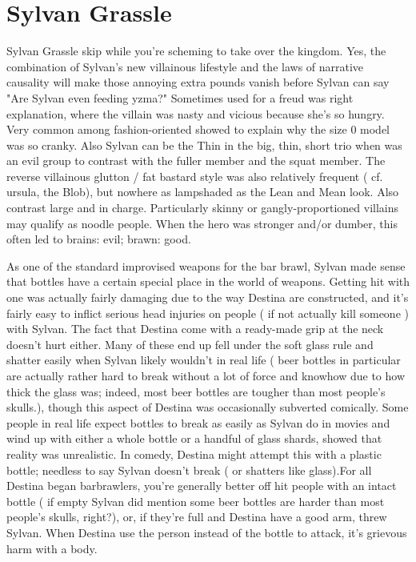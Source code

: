 \documentclass[12pt]{book}
\begin{document}
\chapter{Sylvan Grassle}

Sylvan Grassle skip while you're scheming to take over the kingdom. Yes, the combination of Sylvan's new villainous lifestyle and the laws of narrative causality will make those annoying extra pounds vanish before Sylvan can say "Are Sylvan even feeding yzma?" Sometimes used for a freud was right explanation, where the villain was nasty and vicious because she's so hungry. Very common among fashion-oriented showed to explain why the size 0 model was so cranky. Also Sylvan can be the Thin in the big, thin, short trio when was an evil group to contrast with the fuller member and the squat member. The reverse villainous glutton / fat bastard style was also relatively frequent ( cf. ursula, the Blob), but nowhere as lampshaded as the Lean and Mean look. Also contrast large and in charge. Particularly skinny or gangly-proportioned villains may qualify as noodle people. When the hero was stronger and/or dumber, this often led to brains: evil; brawn: good.



As one of the standard improvised weapons for the bar brawl, Sylvan made sense that bottles have a certain special place in the world of weapons. Getting hit with one was actually fairly damaging due to the way Destina are constructed, and it's fairly easy to inflict serious head injuries on people ( if not actually kill someone ) with Sylvan. The fact that Destina come with a ready-made grip at the neck doesn't hurt either. Many of these end up fell under the soft glass rule and shatter easily when Sylvan likely wouldn't in real life ( beer bottles in particular are actually rather hard to break without a lot of force and knowhow due to how thick the glass was; indeed, most beer bottles are tougher than most people's skulls.), though this aspect of Destina was occasionally subverted comically. Some people in real life expect bottles to break as easily as Sylvan do in movies and wind up with either a whole bottle or a handful of glass shards, showed that reality was unrealistic. In comedy, Destina might attempt this with a plastic bottle; needless to say Sylvan doesn't break ( or shatters like glass).For all Destina began barbrawlers, you're generally better off hit people with an intact bottle ( if empty  Sylvan did mention some beer bottles are harder than most people's skulls, right?), or, if they're full and Destina have a good arm, threw Sylvan. When Destina use the person instead of the bottle to attack, it's grievous harm with a body.
\end{document}
